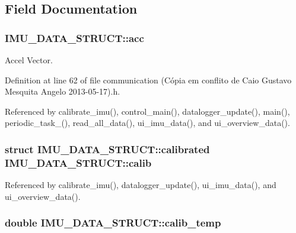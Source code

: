\subsection{Field Documentation}
\hypertarget{structIMU__DATA__STRUCT_a448f284bf44eb503affda586ad5fa9d2}{
\subsubsection[{acc}]{ I\-M\-U\-\_\-\-D\-A\-T\-A\-\_\-\-S\-T\-R\-U\-C\-T\-::acc}}\label{structIMU__DATA__STRUCT_a448f284bf44eb503affda586ad5fa9d2}


Accel Vector. 



Definition at line 62 of file communication (\-Cópia em conflito de Caio Gustavo Mesquita Angelo 2013-\/05-\/17).\-h.



Referenced by calibrate\-\_\-imu(), control\-\_\-main(), datalogger\-\_\-update(), main(), periodic\-\_\-task\-\_(), read\-\_\-all\-\_\-data(), ui\-\_\-imu\-\_\-data(), and ui\-\_\-overview\-\_\-data().

\hypertarget{structIMU__DATA__STRUCT_aeffe3c3c5a7191a5cef16e7aab6c3795}{
\subsubsection[{calib}]{\setlength{\rightskip}{0pt plus 5cm}struct {\bf I\-M\-U\-\_\-\-D\-A\-T\-A\-\_\-\-S\-T\-R\-U\-C\-T\-::calibrated} I\-M\-U\-\_\-\-D\-A\-T\-A\-\_\-\-S\-T\-R\-U\-C\-T\-::calib}}\label{structIMU__DATA__STRUCT_aeffe3c3c5a7191a5cef16e7aab6c3795}


Referenced by calibrate\-\_\-imu(), datalogger\-\_\-update(), ui\-\_\-imu\-\_\-data(), and ui\-\_\-overview\-\_\-data().

\hypertarget{structIMU__DATA__STRUCT_a3553fcee6beba17fe0c7711ac0483875}{
\subsubsection[{calib\-\_\-temp}]{\setlength{\rightskip}{0pt plus 5cm}double I\-M\-U\-\_\-\-D\-A\-T\-A\-\_\-\-S\-T\-R\-U\-C\-T\-::calib\-\_\-temp}}\label{structIMU__DATA__STRUCT_a3553fcee6beba17fe0c7711ac0483875}


